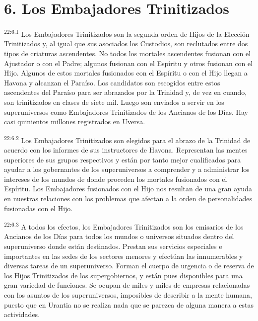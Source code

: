 \section*{6. Los Embajadores Trinitizados}
\par
\textsuperscript{22:6.1} Los Embajadores Trinitizados son la segunda orden de Hijos de la Elección Trinitizados y, al igual que sus asociados los Custodios, son reclutados entre dos tipos de criaturas ascendentes. No todos los mortales ascendentes fusionan con el Ajustador o con el Padre; algunos fusionan con el Espíritu y otros fusionan con el Hijo. Algunos de estos mortales fusionados con el Espíritu o con el Hijo llegan a Havona y alcanzan el Paraíso. Los candidatos son escogidos entre estos ascendentes del Paraíso para ser abrazados por la Trinidad y, de vez en cuando, son trinitizados en clases de siete mil. Luego son enviados a servir en los superuniversos como Embajadores Trinitizados de los Ancianos de los Días. Hay casi quinientos millones registrados en Uversa.

\par
\textsuperscript{22:6.2} Los Embajadores Trinitizados son elegidos para el abrazo de la Trinidad de acuerdo con los informes de sus instructores de Havona. Representan las mentes superiores de sus grupos respectivos y están por tanto mejor cualificados para ayudar a los gobernantes de los superuniversos a comprender y a administrar los intereses de los mundos de donde proceden los mortales fusionados con el Espíritu. Los Embajadores fusionados con el Hijo nos resultan de una gran ayuda en nuestras relaciones con los problemas que afectan a la orden de personalidades fusionadas con el Hijo.

\par
\textsuperscript{22:6.3} A todos los efectos, los Embajadores Trinitizados son los emisarios de los Ancianos de los Días para todos los mundos o universos situados dentro del superuniverso donde están destinados. Prestan sus servicios especiales e importantes en las sedes de los sectores menores y efectúan las innumerables y diversas tareas de un superuniverso. Forman el cuerpo de urgencia o de reserva de los Hijos Trinitizados de los supergobiernos, y están pues disponibles para una gran variedad de funciones. Se ocupan de miles y miles de empresas relacionadas con los asuntos de los superuniversos, imposibles de describir a la mente humana, puesto que en Urantia no se realiza nada que se parezca de alguna manera a estas actividades.

